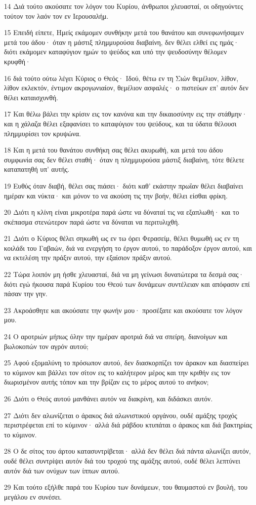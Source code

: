 \par 14 Διά τούτο ακούσατε τον λόγον του Κυρίου, άνθρωποι χλευασταί, οι οδηγούντες τούτον τον λαόν τον εν Ιερουσαλήμ.
\par 15 Επειδή είπετε, Ημείς εκάμομεν συνθήκην μετά του θανάτου και συνεφωνήσαμεν μετά του άδου· όταν η μάστιξ πλημμυρούσα διαβαίνη, δεν θέλει ελθεί εις ημάς· διότι εκάμομεν καταφύγιον ημών το ψεύδος και υπό την ψευδοσύνην θέλομεν κρυφθή·
\par 16 διά τούτο ούτω λέγει Κύριος ο Θεός· Ιδού, θέτω εν τη Σιών θεμέλιον, λίθον, λίθον εκλεκτόν, έντιμον ακρογωνιαίον, θεμέλιον ασφαλές· ο πιστεύων επ' αυτόν δεν θέλει καταισχυνθή.
\par 17 Και θέλω βάλει την κρίσιν εις τον κανόνα και την δικαιοσύνην εις την στάθμην· και η χάλαζα θέλει εξαφανίσει το καταφύγιον του ψεύδους, και τα ύδατα θέλουσι πλημμυρίσει τον κρυψώνα.
\par 18 Και η μετά του θανάτου συνθήκη σας θέλει ακυρωθή, και μετά του άδου συμφωνία σας δεν θέλει σταθή· όταν η πλημμυρούσα μάστιξ διαβαίνη, τότε θέλετε καταπατηθή υπ' αυτής.
\par 19 Ευθύς όταν διαβή, θέλει σας πιάσει· διότι καθ' εκάστην πρωΐαν θέλει διαβαίνει ημέραν και νύκτα· και μόνον το να ακούση τις την βοήν, θέλει είσθαι φρίκη.
\par 20 Διότι η κλίνη είναι μικροτέρα παρά ώστε να δύναταί τις να εξαπλωθή· και το σκέπασμα στενώτερον παρά ώστε να δύναται να περιτυλιχθή.
\par 21 Διότι ο Κύριος θέλει σηκωθή ως εν τω όρει Φερασείμ, θέλει θυμωθή ως εν τη κοιλάδι του Γαβαών, διά να ενεργήση το έργον αυτού, το παράδοξον έργον αυτού, και να εκτελέση την πράξιν αυτού, την εξαίσιον πράξιν αυτού.
\par 22 Τώρα λοιπόν μη ήσθε χλευασταί, διά να μη γείνωσι δυνατώτερα τα δεσμά σας· διότι εγώ ήκουσα παρά Κυρίου του Θεού των δυνάμεων συντέλειαν και απόφασιν επί πάσαν την γην.
\par 23 Ακροάσθητε και ακούσατε την φωνήν μου· προσέξατε και ακούσατε τον λόγον μου.
\par 24 Ο αροτριών μήπως όλην την ημέραν αροτριά διά να σπείρη, διανοίγων και βωλοκοπών τον αγρόν αυτού;
\par 25 Αφού εξομαλύνη το πρόσωπον αυτού, δεν διασκορπίζει τον άρακον και διασπείρει το κύμινον και βάλλει τον σίτον εις το καλήτερον μέρος και την κριθήν εις τον διωρισμένον αυτής τόπον και την βρίζαν εις το μέρος αυτού το ανήκον;
\par 26 Διότι ο Θεός αυτού μανθάνει αυτόν να διακρίνη, και διδάσκει αυτόν.
\par 27 Διότι δεν αλωνίζεται ο άρακος διά αλωνιστικού οργάνου, ουδέ αμάξης τροχός περιστρέφεται επί το κύμινον· αλλά διά ράβδου κτυπάται ο άρακος και διά βακτηρίας το κύμινον.
\par 28 Ο δε σίτος του άρτου κατασυντρίβεται· αλλά δεν θέλει διά πάντα αλωνίζει αυτόν, ουδέ θέλει συντρίψει αυτόν διά του τροχού της αμάξης αυτού, ουδέ θέλει λεπτύνει αυτόν διά των ονύχων των ίππων αυτού.
\par 29 Και τούτο εξήλθε παρά του Κυρίου των δυνάμεων, του θαυμαστού εν βουλή, του μεγάλου εν συνέσει.


